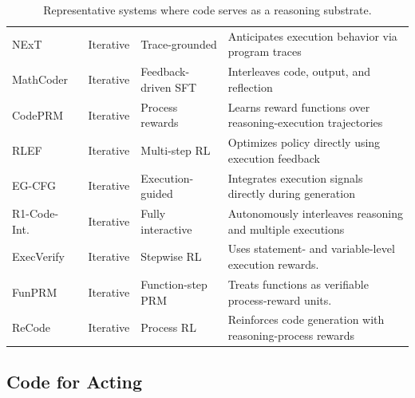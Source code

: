 \documentclass{llmxive}
\begin{document}
\begin{table}[t]
\begin{tabularx}{\textwidth}{p{2.8cm}p{2.2cm}p{3.1cm}X}
NExT~\cite{ni2024next} & Iterative & Trace-grounded & Anticipates execution behavior via program traces \\
MathCoder~\cite{wang2023mathcoder} & Iterative & Feedback-driven SFT & Interleaves code, output, and reflection \\
CodePRM~\cite{li2025codeprm} & Iterative & Process rewards & Learns reward functions over reasoning-execution trajectories \\
RLEF~\cite{gehring2024rlef} & Iterative & Multi-step RL & Optimizes policy directly using execution feedback \\
EG-CFG~\cite{lavon2025execution} & Iterative & Execution-guided & Integrates execution signals directly during generation \\
R1-Code-Int.~\cite{chen2025r1} & Iterative & Fully interactive & Autonomously interleaves reasoning and multiple executions \\
ExecVerify~\cite{tang2026execverifywhiteboxrlverifiable} & Iterative & Stepwise RL & Uses statement- and variable-level execution rewards. \\
FunPRM~\cite{zhang2026funprmfunctionasstepprocessreward} & Iterative & Function-step PRM & Treats functions as verifiable process-reward units. \\
ReCode~\cite{fan2026recodereinforcingcodegeneration} & Iterative & Process RL & Reinforces code generation with reasoning-process rewards \\
\bottomrule
\end{tabularx}
\label{tab:code_reasoning_systems}
\caption{
Representative systems where code serves as a reasoning substrate.
}
\end{table}


\subsection{Code for Acting}
\label{subsec:acting}
\end{document}
